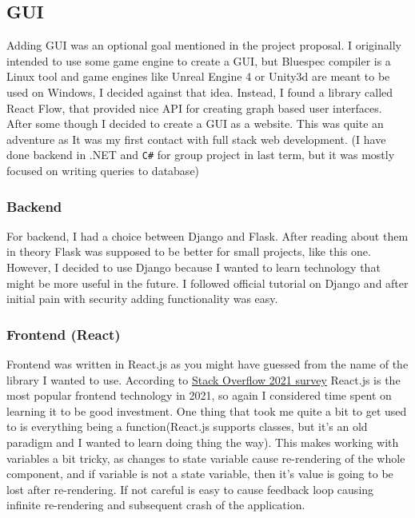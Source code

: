 \documentclass[14pt]{report}
\begin{document}
\subsection{GUI}
Adding GUI was an optional goal mentioned in the project proposal. I originally intended to use some game engine to create a GUI, but Bluespec compiler is a Linux tool and game engines like Unreal Engine 4 or Unity3d are meant to be used on Windows, I decided against that idea. Instead, I found a library called React Flow, that provided nice API for creating graph based user interfaces. After some though I decided to create a GUI as a website. This was quite an adventure as It was my first contact with full stack web development. (I have done backend in .NET and \verb!C#! for group project in last term, but it was mostly focused on writing queries to database)


\subsubsection*{Backend}
For backend, I had a choice between Django and Flask. After reading about them in theory Flask was supposed to be better for small projects, like this one. However, I decided to use Django because I wanted to learn technology that might be more useful in the future. I followed official tutorial on Django and after initial pain with security adding functionality was easy.

\subsubsection*{Frontend (React)}
Frontend was written in React.js as you might have guessed from the name of the library I wanted to use. According to \href{https://insights.stackoverflow.com/survey/2021#most-popular-technologies-webframe}{Stack Overflow 2021 survey} React.js is the most popular frontend technology in 2021, so again I considered time spent on learning it to be good investment. One thing that took me quite a bit to get used to is everything being a function(React.js supports classes, but it's an old paradigm and I wanted to learn doing thing the  way). This makes working with variables a bit tricky, as changes to state variable cause re-rendering of the whole component, and if variable is not a state variable, then it's value is going to be lost after re-rendering. If not careful is easy to cause feedback loop causing infinite re-rendering and subsequent crash of the application. 
\end{document}
